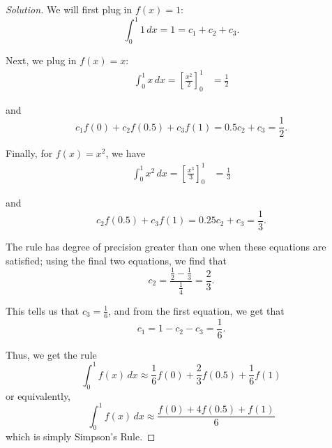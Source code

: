 \documentclass[11pt]{article}
\newenvironment{solution}
  {\renewcommand\qedsymbol{$\blacksquare$}\begin{proof}[Solution]}
  {\end{proof}}
\theoremstyle{definition}
\begin{document}
\begin{solution}
We will first plug in $f(x) = 1$: 
\[ \int_0^1 1 \, dx = 1 = c_1 + c_2 + c_3.\]

Next, we plug in $f(x) = x$:
\begin{align*} \int_0^1 x \, dx = \left[ \frac{x^2}{2} \right]_0^1 &= \frac{1}{2} \end{align*}

and \[ c_1f(0) + c_2f(0.5) + c_3f(1) = 0.5c_2 + c_3 = \frac{1}{2}.\]

Finally, for $f(x) = x^2$, we have
\begin{align*} \int_0^1 x^2 \, dx = \left[ \frac{x^3}{3} \right]_0^1 &= \frac{1}{3} \end{align*}

and \[ c_2f(0.5) + c_3f(1) = 0.25c_2 + c_3 = \frac{1}{3}.\]

The rule has degree of precision greater than one when these equations are satisfied; 
using the final two equations, we find that 
\[c_2 = \frac{\frac{1}{2} - \frac{1}{3}}{\frac{1}{4}} = \frac{2}{3}.\]

This tells us that $c_3 = \frac{1}{6}$, and from the first equation, we get that \[c_1 = 1-c_2 -c_3 = \frac{1}{6}.\]

Thus, we get the rule \[ \int_0^1 f(x) \, dx \approx \frac{1}{6}f(0) + \frac{2}{3}f(0.5) + \frac{1}{6}f(1)\] or equivalently,
\[ \boxed{\int_0^1 f(x) \, dx \approx \frac{f(0) + 4f(0.5) + f(1)}{6}}\]
which is simply Simpson's Rule.
\end{solution}
\end{document}
